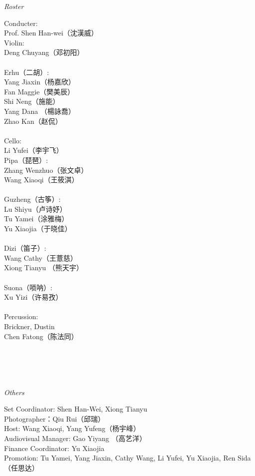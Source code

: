 \documentclass[letter,8pt,poets]{ConcProg}
\begin{document}
\begin{spacing}{1.0}
\begin{center}
\Large\textsl{ Roster}
\end{center}
\begin{multicols}{2}%
\begin{spacing}{1.5}
Conducter:\\
Prof. Shen  Han-wei（沈漢威）
\\
Violin:\\
Deng  Chuyang（邓初阳）\\
\\
Erhu（二胡）:     \\   
Yang  Jiaxin（杨嘉欣）\\  
Fan  Maggie（樊美辰）\\
Shi Neng（施能）\\
Yang  Dana （楊詠喬）\\
Zhao  Kan（赵侃）\\
\\
Cello:\\
Li  Yufei（李宇飞）\\

Pipa（琵琶）:\\
Zhang  Wenzhuo（张文卓）\\
Wang Xiaoqi（王筱淇）\\
\\
Guzheng（{古筝}）:\\
Lu  Shiyu（卢诗妤）\\
Tu  Yamei（涂雅梅）\\
Yu Xiaojia（于晓佳）
\\
\\
Dizi（笛子）: 				 \\
Wang  Cathy（王薏慈）\\
Xiong  Tianyu （熊天宇）\\
\\
Suona（唢呐）:\\
Xu  Yizi（许易孜）
\\
\\
Percussion:\\
Brickner, Dustin\\
Chen Fatong（陈法同）\\
\\
\\
\\
\\
\end{spacing}
\end{multicols}
\begin{center}
\Large\textsl{ Others}
\end{center}
\begin{multicols}{2}%
Set Coordinator: Shen Han-Wei, Xiong Tianyu\\ 
Photographer：Qiu Rui（邱瑞）\\
Host: Wang Xiaoqi, Yang Yufeng（杨宇峰） \\
Audiovisual Manager: Gao Yiyang （高艺洋） \\
Finance Coordinator: Yu Xiaojia \\
Promotion: Tu Yamei, Yang Jiaxin, Cathy Wang, Li Yufei, Yu Xiaojia, Ren Sida （任思达）



\end{multicols}
\end{spacing}
\end{document}

